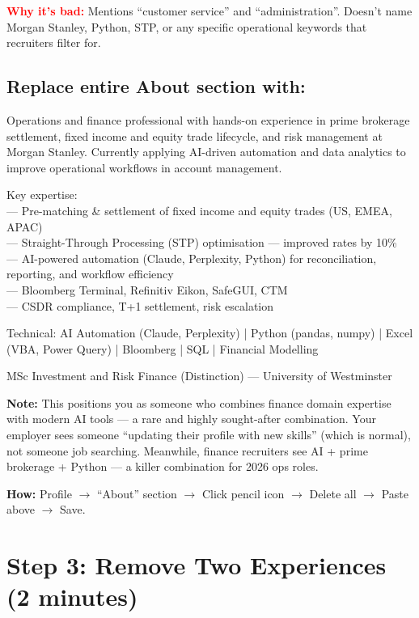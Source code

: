 \documentclass[11pt,a4paper]{article}
\begin{document}
\textcolor{red}{\bfseries Why it's bad:} Mentions ``customer service'' and ``administration''. Doesn't name Morgan Stanley, Python, STP, or any specific operational keywords that recruiters filter for.

\subsection{Replace entire About section with:}
\begin{copybox}
Operations and finance professional with hands-on experience in prime brokerage settlement, fixed income and equity trade lifecycle, and risk management at Morgan Stanley. Currently applying AI-driven automation and data analytics to improve operational workflows in account management.

Key expertise:\\
--- Pre-matching \& settlement of fixed income and equity trades (US, EMEA, APAC)\\
--- Straight-Through Processing (STP) optimisation --- improved rates by 10\%\\
--- AI-powered automation (Claude, Perplexity, Python) for reconciliation, reporting, and workflow efficiency\\
--- Bloomberg Terminal, Refinitiv Eikon, SafeGUI, CTM\\
--- CSDR compliance, T+1 settlement, risk escalation

Technical: AI Automation (Claude, Perplexity) | Python (pandas, numpy) | Excel (VBA, Power Query) | Bloomberg | SQL | Financial Modelling

MSc Investment and Risk Finance (Distinction) --- University of Westminster
\end{copybox}

{\small\textbf{Note:} This positions you as someone who combines finance domain expertise with modern AI tools --- a rare and highly sought-after combination. Your employer sees someone ``updating their profile with new skills'' (which is normal), not someone job searching. Meanwhile, finance recruiters see AI + prime brokerage + Python --- a killer combination for 2026 ops roles.}

\textbf{How:} Profile $\rightarrow$ ``About'' section $\rightarrow$ Click pencil icon $\rightarrow$ Delete all $\rightarrow$ Paste above $\rightarrow$ Save.

\section{Step 3: Remove Two Experiences (2 minutes)}
\end{document}

